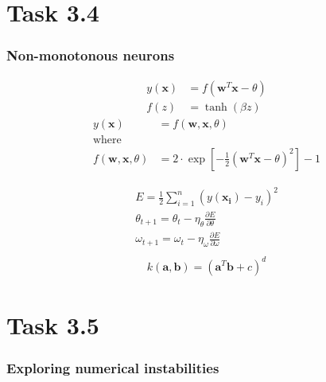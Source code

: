 \documentclass{beamer}
\begin{document}
\section{Task 3.4}

\begin{frame}
	\frametitle{Non-monotonous neurons}
	\begin{align*}
		y(\mathbf{x}) &= f(\mathbf{w}^T\mathbf{x}-\theta)\\
		f(z) &= \tanh(\beta z)
	\end{align*}
	\begin{align*}
		y(\mathbf{x})&= f(\mathbf{w},\mathbf{x},\theta)\\
		\text{where }\\
		f(\mathbf{w},\mathbf{x},\theta) &= 2\cdot\exp\left[-\frac{1}{2}(\mathbf{w}^T\mathbf{x}-\theta)^2\right]-1
	\end{align*}
\end{frame}
\begin{frame}
	\begin{align*}
	E = \frac{1}{2}\sum_{i=1}^{n}(y(\mathbf{x_i})-y_i)^2\\
	\theta_{t+1} = \theta_{t} - \eta_\theta \frac{\partial E}{\partial \theta}\\
	\omega_{t+1} = \omega_{t} - \eta_\omega \frac{\partial E}{\partial \omega}\\
	\end{align*}
	\begin{align*}
		k(\mathbf{a},\mathbf{b}) = (\mathbf{a}^T\mathbf{b}+c)^d
	\end{align*}
\end{frame}

\section{Task 3.5}
\begin{frame}
	\frametitle{Exploring numerical instabilities}
\end{frame}


%
%

\end{document}
